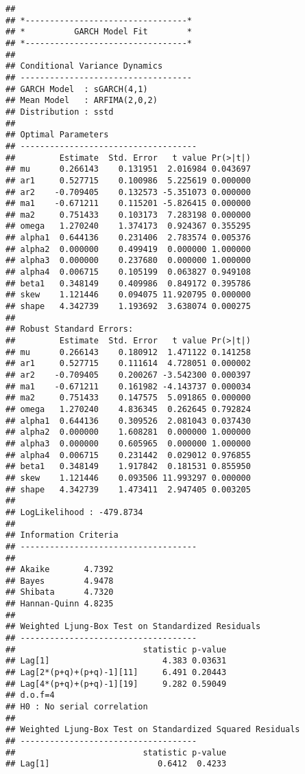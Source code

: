 \documentclass[]{article}
\begin{document}
\begin{verbatim}
## 
## *---------------------------------*
## *          GARCH Model Fit        *
## *---------------------------------*
## 
## Conditional Variance Dynamics    
## -----------------------------------
## GARCH Model  : sGARCH(4,1)
## Mean Model   : ARFIMA(2,0,2)
## Distribution : sstd 
## 
## Optimal Parameters
## ------------------------------------
##         Estimate  Std. Error   t value Pr(>|t|)
## mu      0.266143    0.131951  2.016984 0.043697
## ar1     0.527715    0.100986  5.225619 0.000000
## ar2    -0.709405    0.132573 -5.351073 0.000000
## ma1    -0.671211    0.115201 -5.826415 0.000000
## ma2     0.751433    0.103173  7.283198 0.000000
## omega   1.270240    1.374173  0.924367 0.355295
## alpha1  0.644136    0.231406  2.783574 0.005376
## alpha2  0.000000    0.499419  0.000000 1.000000
## alpha3  0.000000    0.237680  0.000000 1.000000
## alpha4  0.006715    0.105199  0.063827 0.949108
## beta1   0.348149    0.409986  0.849172 0.395786
## skew    1.121446    0.094075 11.920795 0.000000
## shape   4.342739    1.193692  3.638074 0.000275
## 
## Robust Standard Errors:
##         Estimate  Std. Error   t value Pr(>|t|)
## mu      0.266143    0.180912  1.471122 0.141258
## ar1     0.527715    0.111614  4.728051 0.000002
## ar2    -0.709405    0.200267 -3.542300 0.000397
## ma1    -0.671211    0.161982 -4.143737 0.000034
## ma2     0.751433    0.147575  5.091865 0.000000
## omega   1.270240    4.836345  0.262645 0.792824
## alpha1  0.644136    0.309526  2.081043 0.037430
## alpha2  0.000000    1.608281  0.000000 1.000000
## alpha3  0.000000    0.605965  0.000000 1.000000
## alpha4  0.006715    0.231442  0.029012 0.976855
## beta1   0.348149    1.917842  0.181531 0.855950
## skew    1.121446    0.093506 11.993297 0.000000
## shape   4.342739    1.473411  2.947405 0.003205
## 
## LogLikelihood : -479.8734 
## 
## Information Criteria
## ------------------------------------
##                    
## Akaike       4.7392
## Bayes        4.9478
## Shibata      4.7320
## Hannan-Quinn 4.8235
## 
## Weighted Ljung-Box Test on Standardized Residuals
## ------------------------------------
##                          statistic p-value
## Lag[1]                       4.383 0.03631
## Lag[2*(p+q)+(p+q)-1][11]     6.491 0.20443
## Lag[4*(p+q)+(p+q)-1][19]     9.282 0.59049
## d.o.f=4
## H0 : No serial correlation
## 
## Weighted Ljung-Box Test on Standardized Squared Residuals
## ------------------------------------
##                          statistic p-value
## Lag[1]                      0.6412  0.4233

\end{verbatim}
\end{document}
